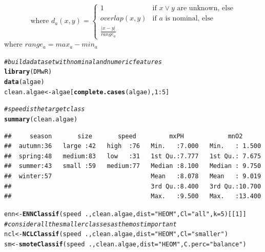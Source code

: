 \documentclass[10pt,a4paper]{article}\usepackage[]{graphicx}\usepackage[]{color}
\makeatletter
\newcommand{\hlnum}[1]{\textcolor[rgb]{0.686,0.059,0.569}{#1}}%
\newcommand{\hlstr}[1]{\textcolor[rgb]{0.192,0.494,0.8}{#1}}%
\newcommand{\hlcom}[1]{\textcolor[rgb]{0.678,0.584,0.686}{\textit{#1}}}%
\newcommand{\hlopt}[1]{\textcolor[rgb]{0,0,0}{#1}}%
\newcommand{\hlstd}[1]{\textcolor[rgb]{0.345,0.345,0.345}{#1}}%
\newcommand{\hlkwb}[1]{\textcolor[rgb]{0.69,0.353,0.396}{#1}}%
\newcommand{\hlkwc}[1]{\textcolor[rgb]{0.333,0.667,0.333}{#1}}%
\newcommand{\hlkwd}[1]{\textcolor[rgb]{0.737,0.353,0.396}{\textbf{#1}}}%
\newenvironment{kframe}{%
 \def\at@end@of@kframe{}%
 \ifinner\ifhmode%
  \def\at@end@of@kframe{\end{minipage}}%
  \begin{minipage}{\columnwidth}%
 \fi\fi%
 \def\FrameCommand##1{\hskip\@totalleftmargin \hskip-\fboxsep
 \colorbox{shadecolor}{##1}\hskip-\fboxsep
     \hskip-\linewidth \hskip-\@totalleftmargin \hskip\columnwidth}%
 \MakeFramed {\advance\hsize-\width
   \@totalleftmargin\z@ \linewidth\hsize
   \@setminipage}}%
 {\par\unskip\endMakeFramed%
 \at@end@of@kframe}
\newenvironment{knitrout}{}{} %
\makeatother
\begin{document}
\begin{equation}\label{eq:auxHEOM}
\mbox{where  } d_a(x,y)= \begin{cases} 1 & \mbox{if } x \vee y \mbox{ are unknown, else} \\
overlap(x,y) & \mbox{if } a \mbox{ is nominal, else} \\
\frac{|x-y|}{range_a}
\end{cases}
\end{equation}
\noindent where $range_a=max_a-min_a$


\begin{knitrout}\footnotesize
{}\color{fgcolor}\begin{kframe}
\begin{alltt}
\hlcom{# build a data set with nominal and numeric features}
\hlkwd{library}\hlstd{(DMwR)}
\hlkwd{data}\hlstd{(algae)}
\hlstd{clean.algae} \hlkwb{<-} \hlstd{algae[}\hlkwd{complete.cases}\hlstd{(algae),}\hlnum{1}\hlopt{:}\hlnum{5}\hlstd{]}

\hlcom{# speed is the target class}
\hlkwd{summary}\hlstd{(clean.algae)}
\end{alltt}
\begin{verbatim}
##     season       size       speed         mxPH            mnO2       
##  autumn:36   large :42   high  :76   Min.   :7.000   Min.   : 1.500  
##  spring:48   medium:83   low   :31   1st Qu.:7.777   1st Qu.: 7.675  
##  summer:43   small :59   medium:77   Median :8.100   Median : 9.750  
##  winter:57                           Mean   :8.078   Mean   : 9.019  
##                                      3rd Qu.:8.400   3rd Qu.:10.700  
##                                      Max.   :9.500   Max.   :13.400
\end{verbatim}
\begin{alltt}
\hlstd{enn} \hlkwb{<-} \hlkwd{ENNClassif}\hlstd{(speed}\hlopt{~}\hlstd{., clean.algae,} \hlkwc{dist}\hlstd{=}\hlstr{"HEOM"}\hlstd{,}  \hlkwc{Cl}\hlstd{=}\hlstr{"all"}\hlstd{,} \hlkwc{k}\hlstd{=}\hlnum{5}\hlstd{)[[}\hlnum{1}\hlstd{]]}
\hlcom{#consider all the smaller classes as the most important}
\hlstd{ncl} \hlkwb{<-} \hlkwd{NCLClassif}\hlstd{(speed}\hlopt{~}\hlstd{., clean.algae,} \hlkwc{dist}\hlstd{=}\hlstr{"HEOM"}\hlstd{,}  \hlkwc{Cl}\hlstd{=}\hlstr{"smaller"}\hlstd{)}
\hlstd{sm} \hlkwb{<-} \hlkwd{smoteClassif}\hlstd{(speed}\hlopt{~}\hlstd{., clean.algae,} \hlkwc{dist}\hlstd{=}\hlstr{"HEOM"}\hlstd{,} \hlkwc{C.perc}\hlstd{=}\hlstr{"balance"}\hlstd{)}
\end{alltt}
\end{kframe}
\end{knitrout}
\end{document}
